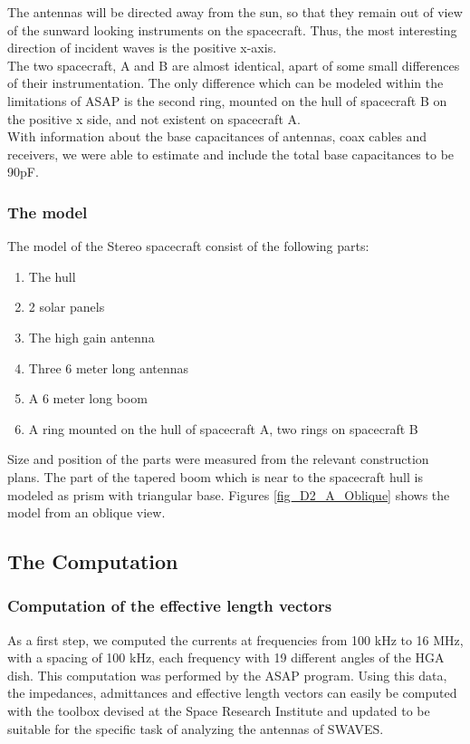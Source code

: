 \documentclass[galley,ras]{agu2001}
\begin{document}
\begin{article}
The antennas will be directed away from the sun, so that they remain out of view of the sunward looking instruments on the spacecraft. Thus, the most interesting direction of incident waves is the positive x-axis. \\

The two spacecraft, A and B are almost identical, apart of some small differences of their instrumentation. The only difference which can be modeled within the limitations of ASAP is the second ring, mounted on the hull of spacecraft B on the positive x side, and not existent on spacecraft A.\\

With information about the base capacitances of antennas, coax cables and receivers, we were able to estimate and include the total base capacitances to be 90pF.\\


\subsubsection{The model}
The model of the Stereo spacecraft consist of the following parts:\\

\begin{enumerate}
\item The hull
\item 2 solar panels
\item The high gain antenna
\item Three 6 meter long antennas
\item A 6 meter long boom
\item A ring mounted on the hull of spacecraft A, two rings on spacecraft B\\
\end{enumerate}

Size and position of the parts were measured from the relevant construction plans. The part of the tapered boom which is near to the spacecraft hull is modeled as prism with triangular base. Figures \ref{fig_D2_A_Oblique} shows the model from an oblique view. \\
%
\subsection{The Computation}
\subsubsection{Computation of the effective length vectors}
As a first step, we computed the currents at frequencies from 100 kHz to 16 MHz, with a spacing of 100 kHz, each frequency with 19 different angles of the HGA dish. This computation was performed by the ASAP program. Using this data, the impedances, admittances and effective length vectors can easily be computed with the toolbox devised at the Space Research Institute and updated to be suitable for the specific task of analyzing the antennas of SWAVES.\\


\end{article}
\end{document}
